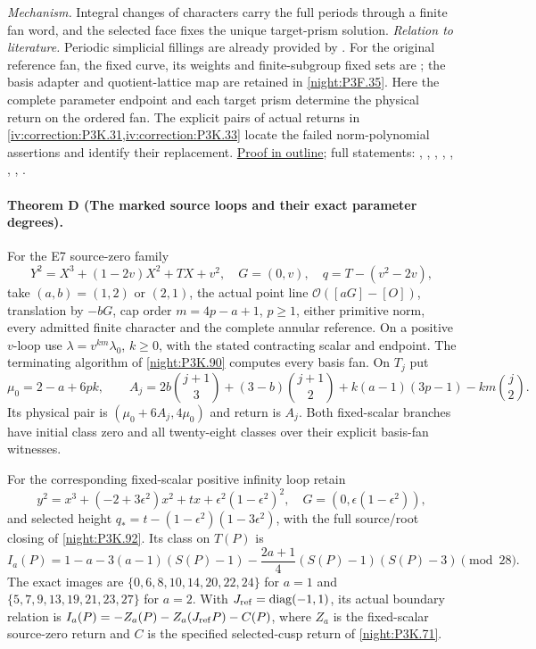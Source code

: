 \textit{Mechanism.} Integral changes of characters carry the full periods through
a finite fan word, and the selected face fixes the unique target-prism solution.
\textit{Relation to literature.} Periodic simplicial fillings are already provided by \cite[Proposition~2.8]{Engel2026}. For the original reference fan, the fixed curve, its weights and finite-subgroup fixed sets are \cite[Proposition~9.24 and Remarks~9.25--9.26, pp.~82--83]{AC26}; the basis adapter and quotient-lattice map are retained in \cref{night:P3F.35}. Here the complete parameter endpoint and each target prism determine the physical return on the ordered fan. The explicit pairs of actual returns in \cref{iv:correction:P3K.31,iv:correction:P3K.33} locate the failed norm-polynomial assertions and identify their replacement.
\hyperlink{outline-IV-C}{Proof in outline}; full statements: , , , , , , , .

\hypertarget{main-IV-D}{}
\paragraph{Theorem D (The marked source loops and their exact parameter degrees).}
\label{series:IV:D}
For the E7 source-zero family
\[
 Y^2=X^3+(1-2v)X^2+TX+v^2,\quad G=(0,v),\quad q=T-(v^2-2v),
\]
take $(a,b)=(1,2)$ or $(2,1)$, the actual point line
$\mathcal O([aG]-[O])$, translation by $-bG$, cap order
$m=4p-a+1$, $p\ge1$, either primitive norm, every admitted
finite character and the complete annular reference. On a positive
$v$-loop use $\lambda=v^{km}\lambda_0$, $k\ge0$, with the stated
contracting scalar and endpoint. The terminating algorithm of
\cref{night:P3K.90} computes every basis fan. On $T_j$ put
\[
 \mu_0=2-a+6pk,\qquad
 A_j=2b\binom{j+1}{3}+(3-b)\binom{j+1}{2}
       +k(a-1)(3p-1)-km\binom j2.
\]
Its physical pair is $(\mu_0+6A_j,4\mu_0)$ and return is $A_j$.
Both fixed-scalar branches have initial class zero and all
twenty-eight classes over their explicit basis-fan witnesses.

For the corresponding fixed-scalar positive infinity loop retain
\[
 y^2=x^3+(-2+3\epsilon^2)x^2+tx+\epsilon^2(1-\epsilon^2)^2,
 \quad G=(0,\epsilon(1-\epsilon^2)),
\]
and selected height $q_*=t-(1-\epsilon^2)(1-3\epsilon^2)$,
with the full source/root closing of \cref{night:P3K.92}.
Its class on $T(P)$ is
\[
 I_a(P)=1-a-3(a-1)(S(P)-1)
        -\frac{2a+1}{4}(S(P)-1)(S(P)-3)\pmod{28}.
\]
The exact images are
$\{0,6,8,10,14,20,22,24\}$ for $a=1$ and
$\{5,7,9,13,19,21,23,27\}$ for $a=2$.
With $J_{\rm ref}=\operatorname{diag}(-1,1)$, its actual boundary
relation is $I_a(P)=-Z_a(P)-Z_a(J_{\rm ref}P)-C(P)$, where
$Z_a$ is the fixed-scalar source-zero return and $C$ is the
specified selected-cusp return of \cref{night:P3K.71}.

